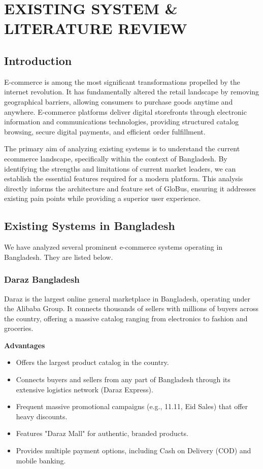 \chapter{EXISTING SYSTEM \& LITERATURE REVIEW}
\section{Introduction}
E-commerce is among the most significant transformations propelled by the internet revolution. It has fundamentally altered the retail landscape by removing geographical barriers, allowing consumers to purchase goods anytime and anywhere. E-commerce platforms deliver digital storefronts through electronic information and communications technologies, providing structured catalog browsing, secure digital payments, and efficient order fulfillment. 

The primary aim of analyzing existing systems is to understand the current ecommerce landscape, specifically within the context of Bangladesh. By identifying the strengths and limitations of current market leaders, we can establish the essential features required for a modern platform. This analysis directly informs the architecture and feature set of GloBus, ensuring it addresses existing pain points while providing a superior user experience.

\section{Existing Systems in Bangladesh}
We have analyzed several prominent e-commerce systems operating in Bangladesh. They are listed below.

\subsection{Daraz Bangladesh}
Daraz is the largest online general marketplace in Bangladesh, operating under the Alibaba Group. It connects thousands of sellers with millions of buyers across the country, offering a massive catalog ranging from electronics to fashion and groceries.

\textbf{Advantages}
\begin{itemize}
    \item Offers the largest product catalog in the country.
    \item Connects buyers and sellers from any part of Bangladesh through its extensive logistics network (Daraz Express).
    \item Frequent massive promotional campaigns (e.g., 11.11, Eid Sales) that offer heavy discounts.
    \item Features "Daraz Mall" for authentic, branded products.
    \item Provides multiple payment options, including Cash on Delivery (COD) and mobile banking.
\end{itemize}

